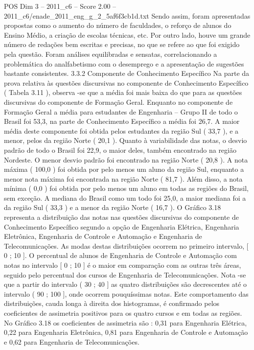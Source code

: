 \begin{textsample}{POS Dim 3 – 2011\_c6 – Score 2.00 – 2011\_c6/enade\_2011\_eng\_g\_2\_5af6f3cb1d.txt}
Sendo assim, foram apresentadas propostas como o aumento do número de faculdades, o reforço de alunos do Ensino Médio, a criação de escolas técnicas, etc.
Por outro lado, houve um grande número de redações bem escritas e precisas, no que se refere ao que foi exigido pela questão.
Foram análises equilibradas e sensatas, correlacionando a problemática do analfabetismo com o desemprego e a apresentação de sugestões bastante consistentes. 3.3.2 Componente de Conhecimento Específico Na parte da prova relativa às questões discursivas no componente de Conhecimento Específico ( Tabela 3.11 ), observa -se que a média foi mais baixa do que para as questões discursivas do componente de Formação Geral.
Enquanto no componente de Formação Geral a média para estudantes de Engenharia – Grupo II de todo o Brasil foi 53,3, na parte de Conhecimento Específico a média foi 26,7.
A maior média deste componente foi obtida pelos estudantes da região Sul ( 33,7 ), e a menor, pelos da região Norte ( 20,1 ).
Quanto à variabilidade das notas, o desvio padrão de todo o Brasil foi 22,9, o maior deles, também encontrado na região Nordeste.
O menor desvio padrão foi encontrado na região Norte ( 20,8 ).
A nota máxima ( 100,0 ) foi obtida por pelo menos um aluno da região Sul, enquanto a menor nota máxima foi encontrada na região Norte ( 81,7 ).
Além disso, a nota mínima ( 0,0 ) foi obtida por pelo menos um aluno em todas as regiões do Brasil, sem exceção.
A mediana do Brasil como um todo foi 25,0, a maior mediana foi a da região Sul ( 33,3 ) e a menor da região Norte ( 16,7 ).
O Gráfico 3.18 representa a distribuição das notas nas questões discursivas do componente de Conhecimento Específico segundo a opção de Engenharia Elétrica, Engenharia Eletrônica, Engenharia de Controle e Automação e Engenharia de Telecomunicações.
As modas destas distribuições ocorrem no primeiro intervalo, [ 0 ; 10 ].
O percentual de alunos de Engenharia de Controle e Automação com notas no intervalo [ 0 ; 10 ] é o maior em comparação com as outras três áreas, seguido pelo percentual dos cursos de Engenharia de Telecomunicações.
Nota -se que a partir do intervalo ( 30 ; 40 ] as quatro distribuições são decrescentes até o intervalo ( 90 ; 100 ], onde ocorrem pouquíssimas notas.
Este comportamento das distribuições, cauda longa à direita dos histogramas, é confirmado pelos coeficientes de assimetria positivos para os quatro cursos e em todas as regiões.
No Gráfico 3.18 os coeficientes de assimetria são : 0,31 para Engenharia Elétrica, 0,22 para Engenharia Eletrônica, 0,81 para Engenharia de Controle e Automação e 0,62 para Engenharia de Telecomunicações.

\end{textsample}

